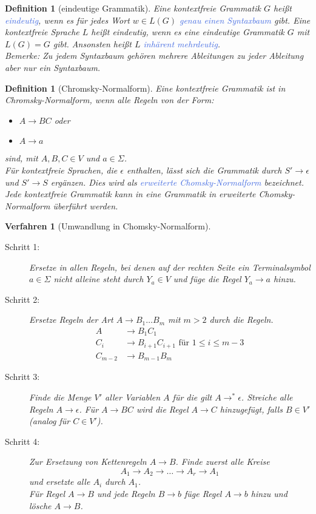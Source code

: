 \documentclass[11pt]{article}
\newcommand{\tcol}[1]{\textcolor{RoyalBlue}{#1}}
\theoremstyle{break}
\newtheorem{defi}[satz]{Definition}
\newtheorem{verf}[satz]{Verfahren}
\begin{document}
\begin{defi}[eindeutige Grammatik]
Eine kontextfreie Grammatik $G$ heißt \tcol{eindeutig}, wenn es für jedes Wort $w\in L(G)$ \tcol{genau einen Syntaxbaum} gibt. Eine kontextfreie Sprache $L$ heißt eindeutig, wenn es eine eindeutige Grammatik $G$ mit $L(G)=G$ gibt. Ansonsten heißt $L$ \tcol{inhärent mehrdeutig}.\\
Bemerke: Zu jedem Syntaxbaum gehören mehrere Ableitungen zu jeder Ableitung aber nur ein Syntaxbaum.
\end{defi}

\begin{defi}[Chromsky-Normalform]
Eine kontextfreie Grammatik ist in Chromsky-Normalform, wenn alle Regeln von der Form:
\begin{itemize}
\item $A\rightarrow BC$ oder
\item $A\rightarrow a$
\end{itemize}
sind, mit $A,B,C\in V$ und $a\in\Sigma$.\\
Für kontextfreie Sprachen, die $\epsilon$ enthalten, lässt sich die Grammatik durch $S'\rightarrow\epsilon$ und $S'\rightarrow S$ ergänzen. Dies wird als \tcol{erweiterte Chomsky-Normalform\index{erweiterte Chomsky-Normalform}} bezeichnet.\\
Jede kontextfreie Grammatik kann in eine Grammatik in erweiterte Chomsky-Normalform überführt werden.
\end{defi}

\begin{verf}[Umwandlung in Chomsky-Normalform]
\begin{description}
\item[Schritt 1:] Ersetze in allen Regeln, bei denen auf der rechten Seite ein Terminalsymbol $a\in\Sigma$ nicht alleine steht durch $Y_a\in V$ und füge die Regel $Y_a\rightarrow a$ hinzu.
\item[Schritt 2:] Ersetze Regeln der Art $A\rightarrow B_1\dots B_m$ mit $m>2$ durch die Regeln.
\begin{align*}
A&\rightarrow B_1C_1\\
C_i&\rightarrow B_{i+1}C_{i+1} \text{ für } 1\leq i\leq m-3\\
C_{m-2}&\rightarrow B_{m-1}B_m
\end{align*}
\item[Schritt 3:] Finde die Menge $V'$ aller Variablen $A$ für die gilt $A\rightarrow^*\epsilon$. Streiche alle Regeln $A\rightarrow\epsilon$. Für $A\rightarrow BC$ wird die Regel $A\rightarrow C$ hinzugefügt, falls $B\in V'$ (analog für $C\in V'$).
\item[Schritt 4:] Zur Ersetzung von Kettenregeln $A\rightarrow B$. Finde zuerst alle Kreise \[A_1\rightarrow A_2\rightarrow\dots\rightarrow A_r\rightarrow A_1\] und ersetzte alle $A_i$ durch $A_1$.\\
Für Regel $A\rightarrow B$ und jede Regeln $B\rightarrow b$ füge Regel $A\rightarrow b$ hinzu und lösche $A\rightarrow B$.
\end{description}
\end{verf}
\end{document}
